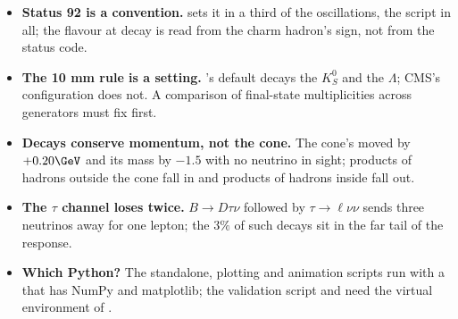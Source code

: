 \begin{pitfalls}
\begin{itemize}[nosep]
    neutrinos contribute little to it; the loss to a jet is the
    neutrino's \pt in the cone, not the event's \ptmiss.
  \item \textbf{Status 92 is a convention.} \PYTHIA sets it in a third of
    the oscillations, the script in all; the flavour at decay is read from
    the charm hadron's sign, not from the status code.
  \item \textbf{The 10 mm rule is a setting.} \PYTHIA's default decays the
    $K_S^0$ and the $\Lambda$; CMS's configuration does not. A comparison
    of final-state multiplicities across generators must fix
     first.
  \item \textbf{Decays conserve momentum, not the cone.} The cone's \pt
    moved by $+0.20\GeV$ and its mass by $-1.5$ with no neutrino in sight;
    products of hadrons outside the cone fall in and products of hadrons
    inside fall out.
  \item \textbf{The $\tau$ channel loses twice.} $B\to D\tau\nu$ followed
    by $\tau\to\ell\nu\nu$ sends three neutrinos away for one lepton; the
    $3\%$ of such decays sit in the far tail of the response.
  \item \textbf{Which Python?} The standalone, plotting and animation
    scripts run with a  that has NumPy and matplotlib; the
    validation script and  need the virtual
    environment of .
\end{itemize}
\end{pitfalls}

